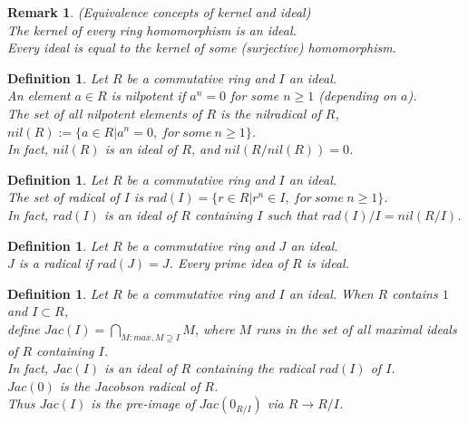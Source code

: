 \documentclass[a4paper,sfsidenotes,openany]{tufte-book}
\theoremstyle{theorem}
\newtheorem{definition}[theorem]{Definition}
\newtheorem{remark}[theorem]{Remark}
\begin{document}
\begin{fullwidth}
\begin{remark}
\textit{{\color{blue} (Equivalence concepts of kernel and ideal)}}\\
The kernel of every ring homomorphism is an ideal.\\
Every ideal is equal to the kernel of some (surjective) homomorphism.\\
\end{remark}
\>

\begin{definition}
Let $R$ be a commutative ring and $I$ an ideal.\\
An element $a \in R$ is 	\textit{{\color{blue} nilpotent}} if $a^n = 0$ for some $n \geq 1$ (depending on $a$).\\
The set of all nilpotent elements of $R$ is the 	\textit{{\color{blue} nilradical of $R$}}, $nil(R) := \{a \in R | a^n = 0, \ for \ some \ n \geq 1 \}$.\\
In fact, $nil(R)$ is an ideal of $R$, and $nil(R/nil(R)) = 0$.\\
\end{definition}
\>

\begin{definition}
Let $R$ be a commutative ring and $I$ an ideal.\\
The set of \textit{{\color{blue} radical of $I$}} is $rad(I) = \{ r \in R | r^n \in I, \ for \ some \ n \geq 1\}$.\\
In fact, $rad(I)$ is an ideal of $R$ containing $I$ such that $rad(I)/I = nil(R/I)$.\\
\end{definition}
\>

\begin{definition}
Let $R$ be a commutative ring and $J$ an ideal.\\
$J$ is a radical if $rad(J) = J$. Every prime idea of $R$ is ideal.\\
\end{definition}
\>

\begin{definition}
Let $R$ be a commutative ring and $I$ an ideal.
When $R$ contains $1$ and $I \subset R$, \\
define $Jac(I) = \bigcap_{M: max, M \supseteq I} M$, where $M$ runs in the set of all maximal ideals of $R$ containing $I$.\\
In fact, $Jac(I)$ is an ideal of $R$ containing the radical $rad(I)$ of $I$.\\
$Jac(0)$ is the \textit{{\color{blue} Jacobson radical of $R$}}.\\
Thus $Jac(I)$ is the pre-image of $Jac(0_{R/I})$ via $R \rightarrow R/I$.\\
\end{definition}
\>


\end{fullwidth}
\end{document}
